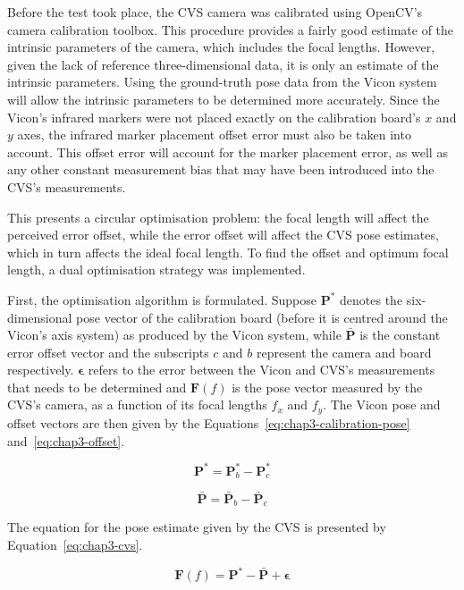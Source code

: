 Before the test took place, the CVS camera was calibrated using OpenCV's camera calibration toolbox. This procedure provides a fairly good estimate of the intrinsic parameters of the camera, which includes the focal lengths. However, given the lack of reference three-dimensional data, it is only an estimate of the intrinsic parameters. Using the ground-truth pose data from the Vicon system will allow the intrinsic parameters to be determined more accurately. Since the Vicon's infrared markers were not placed exactly on the calibration board's $x$ and $y$ axes, the infrared marker placement offset error must also be taken into account. This offset error will account for the marker placement error, as well as any other constant measurement bias that may have been introduced into the CVS's measurements. 

This presents a circular optimisation problem: the focal length will affect the perceived error offset, while the error offset will affect the CVS pose estimates, which in turn affects the ideal focal length. To find the offset and optimum focal length, a dual optimisation strategy was implemented.  

First, the optimisation algorithm is formulated. Suppose $\bm{P}^*$ denotes the six-dimensional pose vector of the calibration board (before it is centred around the Vicon's axis system) as produced by the Vicon system, while $\bar{\bm{P}}$ is the constant error offset vector and the subscripts $c$ and $b$ represent the camera and board respectively. $\bm{\epsilon}$ refers to the error between the Vicon and CVS's measurements that needs to be determined and $\bm{F}(f)$ is the pose vector measured by the CVS's camera, as a function of its focal lengths $f_x$ and $f_y$. The Vicon pose and offset vectors are then given by the Equations~\ref{eq:chap3-calibration-pose} and~\ref{eq:chap3-offset}.

\begin{equation}
 \label{eq:chap3-calibration-pose}
  \bm{P}^* = \bm{P}^*_b - \bm{P}^*_c
\end{equation}

\begin{equation}
  \label{eq:chap3-offset}
  \bar{\bm{P}} = \bar{\bm{P}}_b - \bar{\bm{P}}_c
\end{equation}

The equation for the pose estimate given by the CVS is presented by Equation~\ref{eq:chap3-cvs}.

\begin{equation}
  \label{eq:chap3-cvs}
  \bm{F}(f) = \bm{P}^* - \bar{\bm{P}} + \bm{\epsilon}
\end{equation}

